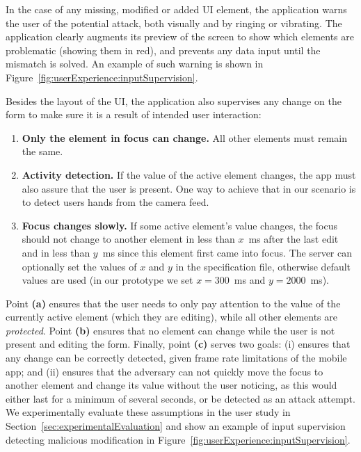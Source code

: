 In the case of any missing, modified or added UI element, the application warns the user of the potential attack, both visually and by ringing or vibrating.
The application clearly augments its preview of the screen to show which elements are problematic (showing them in red), and prevents any data input until the mismatch is solved.
An example of such warning is shown in Figure~\ref{fig:userExperience:inputSupervision}.


Besides the layout of the UI, the application also supervises any change on the form to make sure it is a result of intended user interaction:

\begin{enumerate} [label=(\alph*), leftmargin=*]
    \item \textbf{Only the element in focus can change.}
    All other elements must remain the same.
    \item \textbf{Activity detection.}
    If the value of the active element changes, the app must also assure that the user is present. One way to achieve that in our scenario is to detect users hands from the camera feed.
    \item \textbf{Focus changes slowly.}
    If some active element's value changes, the focus should not change to another element in less than $x$~ms after the last edit and in less than $y$~ms since this element first came into focus.
    The server can optionally set the values of $x$ and $y$ in the specification file, otherwise default values are used (in our prototype we set $x=300$~ms and $y=2000$~ms).


\end{enumerate}


Point \textbf{(a)} ensures that the user needs to only pay attention to the value of the currently active element (which they are editing), while all other elements are \emph{protected}.
Point \textbf{(b)} ensures that no element can change while the user is not present and editing the form.
Finally, point \textbf{(c)} serves two goals: (i) ensures that any change can be correctly detected, given frame rate limitations of the mobile app; and (ii) ensures that the adversary can not quickly move the focus to another element and change its value without the user noticing, as this would either last for a minimum of several seconds, or be detected as an attack attempt.
We experimentally evaluate these assumptions in the user study in Section~\ref{sec:experimentalEvaluation} and show an example of input supervision detecting malicious modification in Figure~\ref{fig:userExperience:inputSupervision}.

